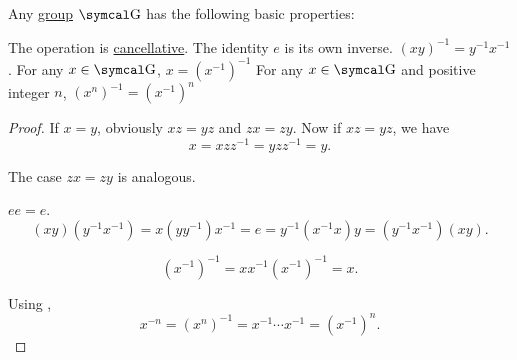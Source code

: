 \begin{proposition}\label{thm:group_properties}
  Any \hyperref[def:group]{group} \( \CG \) has the following basic properties:
  \begin{PropEnum}
     The operation is \hyperref[def:magma/cancellative]{cancellative}.
     The identity \( e \) is its own inverse.
     \( (xy)^{-1} = y^{-1} x^{-1} \).
     For any \( x \in \CG \), \( x = (x^{-1})^{-1} \)
     For any \( x \in \CG \) and positive integer \( n \), \( (x^n)^{-1} = (x^{-1})^n \)
  \end{PropEnum}
\end{proposition}
\begin{proof}
   If \( x = y \), obviously \( xz = yz \) and \( zx = zy \). Now if \( xz = yz \), we have
  \begin{equation*}
    x = xzz^{-1} = yzz^{-1} = y.
  \end{equation*}

  The case \( zx = zy \) is analogous.

   \( ee = e \).
  \begin{equation*}
    (xy) (y^{-1} x^{-1})
    =
    x (y y^{-1}) x^{-1}
    =
    e
    =
    y^{-1} (x^{-1} x) y
    =
    (y^{-1} x^{-1}) (xy).
  \end{equation*}

  \begin{equation*}
    (x^{-1})^{-1}
    =
    x x^{-1} (x^{-1})^{-1}
    =
    x.
  \end{equation*}

   Using ,
  \begin{equation*}
    x^{-n}
    =
    (x^n)^{-1}
    =
    x^{-1} \cdots x^{-1}
    =
    (x^{-1})^n.
  \end{equation*}
\end{proof}

